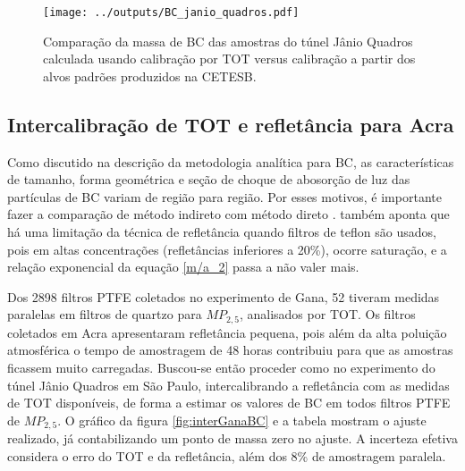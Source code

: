 \begin{figure}[H]
  \centering
  \begin{minipage}[b]{0.5\linewidth}
    \texttt{[image: ../outputs/BC\_janio\_quadros.pdf]}
    \caption{Comparação da massa de BC das amostras do túnel Jânio Quadros 
             calculada usando calibração por TOT versus calibração a partir dos 
             alvos padrões produzidos na CETESB. \label{fig:JQ}}
  \end{minipage}
  \hspace{0.5cm}
  \begin{minipage}[b]{0.45\linewidth}
    \begin{small}
      
    \end{small}
  \end{minipage}
\end{figure}

\newpage
\subsection{Intercalibração de TOT e refletância para Acra}

Como discutido na descrição da metodologia analítica para BC, as características
de tamanho, forma geométrica e seção de choque de abosorção de luz das 
partículas de BC variam de região para região.
Por esses motivos, é importante fazer a comparação de método indireto com método
direto \citep{quincey2007}. \citet{taha2007} também aponta que há uma limitação 
da técnica de refletância quando filtros de teflon são usados, pois em altas 
concentrações (refletâncias inferiores a 20\%), ocorre saturação, e a 
relação exponencial da equação \ref{m/a_2} passa a não valer 
mais. 

Dos 2898 filtros PTFE coletados no experimento de Gana, 52 tiveram medidas 
paralelas em filtros de quartzo para $MP_{2,5}$, analisados por TOT.
Os filtros coletados em Acra apresentaram refletância pequena, pois além da 
alta poluição atmosférica o tempo de amostragem de 48 horas contribuiu para que
as amostras ficassem muito carregadas. Buscou-se então proceder como no 
experimento do túnel Jânio Quadros em São Paulo, intercalibrando a refletância 
com as medidas de TOT disponíveis, de forma a estimar os valores de BC em todos 
filtros PTFE de $MP_{2,5}$. O gráfico da figura \ref{fig:interGanaBC} e a 
tabela \label{table:interGanaBC} mostram o ajuste realizado, já contabilizando 
um ponto de massa zero no ajuste. A incerteza efetiva considera o erro do TOT 
e da refletância, além dos 8\% de amostragem paralela. 

